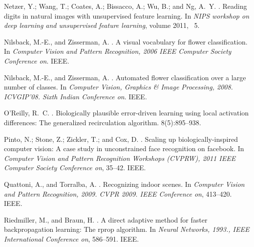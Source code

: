 \documentclass[letterpaper]{article}
\begin{document}
\begin{thebibliography}{}
Netzer, Y.; Wang, T.; Coates, A.; Bissacco, A.; Wu, B.; and Ng, A.~Y.
.
\newblock Reading digits in natural images with unsupervised feature learning.
\newblock In {\em NIPS workshop on deep learning and unsupervised feature
  learning}, volume 2011, ~5.

Nilsback, M.-E., and Zisserman, A.
.
\newblock A visual vocabulary for flower classification.
\newblock In {\em Computer Vision and Pattern Recognition, 2006 IEEE Computer
  Society Conference on}.
\newblock IEEE.

Nilsback, M.-E., and Zisserman, A.
.
\newblock Automated flower classification over a large number of classes.
\newblock In {\em Computer Vision, Graphics \& Image Processing, 2008.
  ICVGIP'08. Sixth Indian Conference on}.
\newblock IEEE.

O'Reilly, R.~C.
.
\newblock Biologically plausible error-driven learning using local activation
  differences: The generalized recirculation algorithm.
 8(5):895--938.

Pinto, N.; Stone, Z.; Zickler, T.; and Cox, D.
.
\newblock Scaling up biologically-inspired computer vision: A case study in
  unconstrained face recognition on facebook.
\newblock In {\em Computer Vision and Pattern Recognition Workshops (CVPRW),
  2011 IEEE Computer Society Conference on},  35--42.
\newblock IEEE.

Quattoni, A., and Torralba, A.
.
\newblock Recognizing indoor scenes.
\newblock In {\em Computer Vision and Pattern Recognition, 2009. CVPR 2009.
  IEEE Conference on},  413--420.
\newblock IEEE.

Riedmiller, M., and Braun, H.
.
\newblock A direct adaptive method for faster backpropagation learning: The
  rprop algorithm.
\newblock In {\em Neural Networks, 1993., IEEE International Conference on},
  586--591.
\newblock IEEE.


\end{thebibliography}
\end{document}
